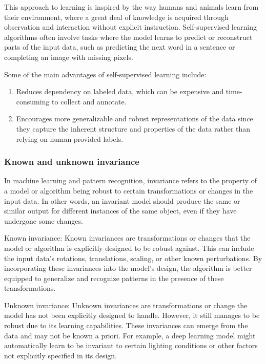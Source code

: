 This approach to learning is inspired by the way humans and animals learn from their environment, where a great deal of knowledge is acquired through observation and interaction without explicit instruction. Self-supervised learning algorithms often involve tasks where the model learns to predict or reconstruct parts of the input data, such as predicting the next word in a sentence or completing an image with missing pixels.

Some of the main advantages of self-supervised learning include:

\begin{enumerate}
\item Reduces dependency on labeled data, which can be expensive and time-consuming to collect and annotate.
\item Encourages more generalizable and robust representations of the data since they capture the inherent structure and properties of the data rather than relying on human-provided labels.
\end{enumerate} 

\subsubsection{Known and unknown invariance}

In machine learning and pattern recognition, invariance refers to the property of a model or algorithm being robust to certain transformations or changes in the input data. In other words, an invariant model should produce the same or similar output for different instances of the same object, even if they have undergone some changes.

Known invariance: Known invariances are transformations or changes that the model or algorithm is explicitly designed to be robust against. This can include the input data's rotations, translations, scaling, or other known perturbations. By incorporating these invariances into the model's design, the algorithm is better equipped to generalize and recognize patterns in the presence of these transformations.

Unknown invariance: Unknown invariances are transformations or change the model has not been explicitly designed to handle. However, it still manages to be robust due to its learning capabilities. These invariances can emerge from the data and may not be known a priori. For example, a deep learning model might automatically learn to be invariant to certain lighting conditions or other factors not explicitly specified in its design.

